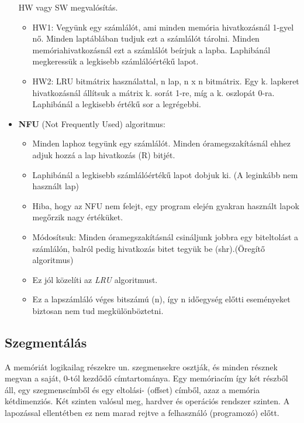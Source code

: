 \documentclass[tikz,12pt,margin=0px]{article}
\begin{document}
\begin{itemize}[topsep=8pt,itemsep=4pt,partopsep=4pt, parsep=4pt]
        HW vagy SW megvalósítás.
        \begin{itemize}
            \item HW1: Vegyünk egy számlálót, ami minden memória hivatkozásnál 1-gyel nő. Minden laptáblában tudjuk ezt a számlálót tárolni. Minden memóriahivatkozásnál ezt a számlálót beírjuk a lapba. Laphibánál megkeressük a legkisebb számlálóértékű lapot.
            \item HW2: LRU bitmátrix használattal, n lap, n x n bitmátrix. Egy k. lapkeret hivatkozásnál állítsuk a mátrix k. sorát 1-re, míg a k. oszlopát 0-ra. Laphibánál a legkisebb értékű sor a legrégebbi.
		\end{itemize}
		\item \textbf{NFU} (Not Frequently Used) algoritmus:
		\begin{itemize}
            \item Minden laphoz tegyünk egy számlálót. Minden óramegszakításnál ehhez adjuk hozzá a lap hivatkozás (R) bitjét.
			\item Laphibánál a legkisebb számlálóértékű lapot dobjuk ki. (A leginkább nem használt lap)
			\item Hiba, hogy az NFU nem felejt, egy program elején gyakran használt lapok megőrzik nagy értéküket.
			\item Módosítsuk: Minden óramegszakításnál csináljunk jobbra egy biteltolást a számlálón, balról pedig hivatkozás bitet tegyük be (shr).(Öregítő algoritmus)
			\item Ez jól közelíti az \emph{LRU} algoritmust.
			\item Ez a lapszámláló véges bitszámú (n), így n időegység előtti eseményeket biztosan nem tud megkülönböztetni.
		\end{itemize}
	\end{itemize}

	\subsection*{Szegmentálás}

    A memóriát logikailag részekre un. szegmensekre osztják, és minden résznek megvan a saját, 0-tól kezdődő címtartománya. Egy memóriacím így két részből áll, egy szegmenscímből és egy eltolási- (offset) címből, azaz a memória kétdimenziós. Két szinten valósul meg, hardver és operációs rendszer szinten. A lapozással ellentétben ez nem marad rejtve a felhasználó (programozó) előtt.\\
\end{document}
